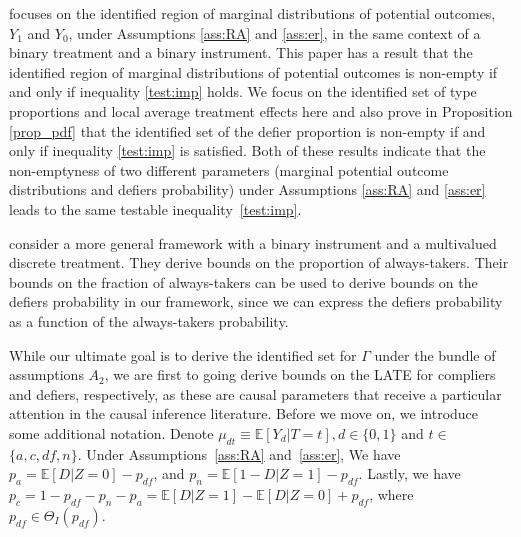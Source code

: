 \documentclass[12pt]{article}
\theoremstyle{plain}
\theoremstyle{definition}
\theoremstyle{remark}
\begin{document}
\cite{Kitagawa2021TheIndependence} focuses on the identified region of marginal distributions of potential outcomes, $Y_1$ and $Y_0$, under Assumptions \ref{ass:RA} and \ref{ass:er}, in the same context of a binary treatment and a binary instrument. This paper has a result that the identified region of marginal distributions of potential outcomes is non-empty if and only if inequality \eqref{test:imp} holds. We focus on the identified set of type proportions and local average treatment effects here and also prove in Proposition \ref{prop_pdf} that the identified set of the defier proportion is non-empty if and only if inequality \eqref{test:imp} is satisfied. Both of these results indicate that the non-emptyness of two different parameters (marginal potential outcome distributions and defiers probability) under Assumptions \ref{ass:RA} and \ref{ass:er} leads to the same testable  inequality~\eqref{test:imp}.

\cite{kwon2024testing} consider a more general framework with a binary instrument and a multivalued discrete treatment. They derive bounds on the proportion of always-takers. Their bounds on the fraction of always-takers can be used to derive bounds on the defiers probability in our framework, since we can express the defiers probability as a function of the always-takers probability.

While our ultimate goal is to derive the identified set for $\Gamma$ under the bundle of assumptions $A_2$, we are first to going derive bounds on the LATE for compliers and defiers, respectively, as these are causal parameters that receive a particular attention in the causal inference literature. Before we move on, we introduce some additional notation. Denote $\mu_{d t} \equiv \mathbb{E}\left[Y_d  \vert  T=t\right], d \in\{0,1\}$ and $t \in$ $\{a, c, d f, n\}$. Under Assumptions~\ref{ass:RA} and~\ref{ass:er}, We have $p_a=\mathbb{E}[D  \vert  Z=0]-p_{d f}$, and $p_n= \mathbb{E}[1-D  \vert  Z=1]-p_{d f}.$ Lastly, we have $p_c=1-p_{df}-p_n-p_a=\mathbb{E}[D  \vert  Z=1] - \mathbb{E}[D  \vert  Z=0] +p_{df}$, where $p_{df} \in \Theta_I(p_{df}).$
\end{document}

